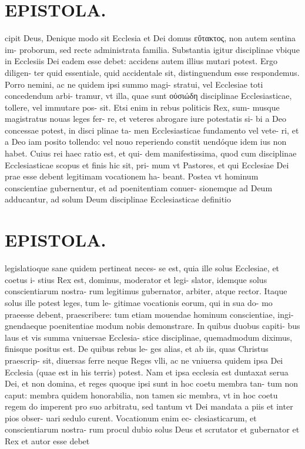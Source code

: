 \documentclass{article}
\begin{document}
\begin{pages}
\section*{EPISTOLA. }cipit Deus, Denique modo sit Ecclesia et Dei domus εὔτακτος, non autem sentina im- proborum, sed recte administrata familia. Substantia igitur disciplinae vbique in Ecclesiis Dei eadem esse debet: accidens autem illius mutari potest. Ergo diligen- ter quid essentiale, quid accidentale sit, distinguendum esse respondemus. Porro nemini, ac ne quidem ipsi summo magi- stratui, vel Ecclesiae toti concedendum arbi- tramur, vt illa, quae sunt οὐσιώδη disciplinae Ecclesiasticae, tollere, vel immutare pos- sit. Etsi enim in rebus politicis Rex, sum- musque magistratus nouas leges fer- re, et veteres abrogare iure potestatis si- bi a Deo concessae potest, in disci plinae ta- men Ecclesiasticae fundamento vel vete- ri, et a Deo iam posito tollendo: vel nouo reperiendo constit uendóque idem ius non habet. Cuius rei haec ratio est, et qui- dem manifestissima, quod cum disciplinae Ecclesiasticae scopus et finis hic sit, pri- mum vt Pastores, et qui Ecclesiae Dei prae esse debent legitimam vocationem ha- beant. Postea vt hominum conscientiae gubernentur, et ad poenitentiam conuer- sionemque ad Deum adducantur, ad solum Deum disciplinae Ecclesiasticae definitio 
\section*{EPISTOLA. }legislatioque sane quidem pertineat neces- se est, quia ille solus Ecclesiae, et coetus i- stius Rex est, dominus, moderator et legi- slator, idemque solus conscientiarum nostra- rum legitimus gubernator, arbiter, atque rector. Itaque solus ille potest leges, tum le- gitimae vocationis eorum, qui in sua do- mo praeesse debent, praescribere: tum etiam mouendae hominum conscientiae, ingi- gnendaeque poenitentiae modum nobis demonstrare. In quibus duobus capiti- bus laus et vis summa vniuersae Ecclesia- stice disciplinae, quemadmodum diximus, finisque positus est. De quibus rebus le- ges alias, et ab iis, quas Christus praescrip- sit, diuersas ferre neque Reges vlli, ac ne vniuersa quidem ipsa Dei Ecclesia (quae est in his terris) potest. Nam et ipsa ecclesia est duntaxat serua Dei, et non domina, et reges quoque ipsi sunt in hoc coetu membra tan- tum non caput: membra quidem honorabilia, non tamen sic membra, vt in hoc coetu regem do imperent pro suo arbitratu, sed tantum vt Dei mandata a piis et inter pios obser- uari sedulo curent. Vocationum enim ec- clesiasticarum, et conscientiarum nostra- rum procul dubio solus Deus et scrutator et gubernator et Rex et autor esse debet 

\end{pages}
\end{document}
